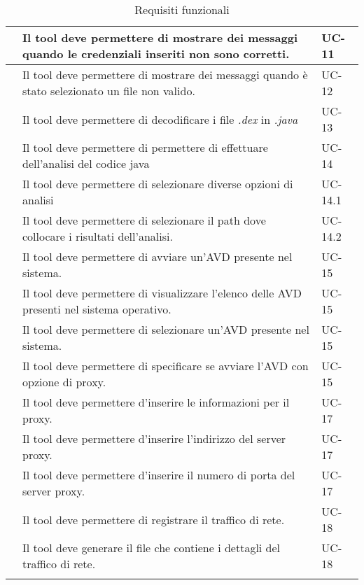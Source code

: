 \begin{center}
\begin{longtable}{ | c| C{7cm} |C{3cm} |}
        & Il tool deve permettere di mostrare dei messaggi quando le credenziali inseriti non sono corretti.& UC-11 \\\hline
        & Il tool deve permettere di mostrare dei messaggi quando è stato selezionato un file non valido.& UC-12 \\\hline
        & Il tool deve permettere di decodificare i file \textit{.dex} in \textit{.java} & UC-13\\\hline
        & Il tool deve permettere di permettere di effettuare dell'analisi del codice java& UC-14 \\\hline
        & Il tool deve permettere di selezionare diverse opzioni di analisi &UC-14.1 \\\hline
        & Il tool deve permettere di selezionare il path dove collocare i risultati dell'analisi.& UC-14.2\\\hline
        \setcounter{subCount}{0}

         & Il tool deve permettere di avviare un'AVD presente nel sistema.&UC-15\\\hline
         & Il tool deve permettere di visualizzare l'elenco delle AVD presenti nel sistema operativo.&UC-15\\\hline
         & Il tool deve permettere di selezionare un'AVD presente nel sistema.&UC-15\\\hline
         & Il tool deve permettere di specificare se avviare l'AVD con opzione di proxy.&UC-15\\\hline
        \setcounter{subCount}{0}
         & Il tool deve permettere d'inserire le informazioni per il proxy.&UC-17\\\hline
        & Il tool deve permettere d'inserire l'indirizzo del server proxy.&UC-17\\\hline
        & Il tool deve permettere d'inserire il numero di porta del server proxy.&UC-17\\\hline
        \setcounter{subCount}{0}
         & Il tool deve permettere di registrare il traffico di rete.&UC-18\\\hline
        & Il tool deve generare il file che contiene i dettagli del traffico di rete.&UC-18\\\hline
        \caption{Requisiti funzionali}
    \end{longtable}
\end{center}
\setcounter{rowcount}{0}

